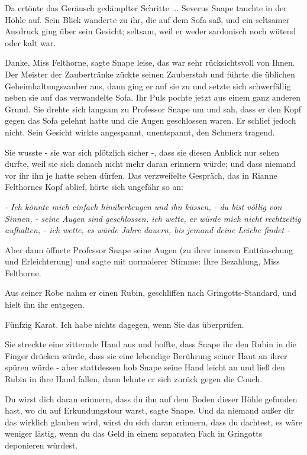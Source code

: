Da ertönte das Geräusch gedämpfter Schritte ... Severus Snape tauchte in der
Höhle auf. Sein Blick wanderte zu ihr, die auf dem Sofa saß, und ein seltsamer
Ausdruck ging über sein Gesicht; seltsam, weil er weder sardonisch noch wütend
oder kalt war.

\glqq{}Danke, Miss Felthorne\grqq{}, sagte Snape leise, \glqq{}das war sehr
rücksichtsvoll von Ihnen.\grqq{} Der Meister der Zaubertränke zückte seinen
Zauberstab und führte die üblichen Geheimhaltungszauber aus, dann ging er auf
sie zu und setzte sich schwerfällig neben sie auf das verwandelte Sofa. Ihr Puls
pochte jetzt aus einem ganz anderen Grund. Sie drehte sich langsam zu Professor
Snape um und sah, dass er den Kopf gegen das Sofa gelehnt hatte und die Augen
geschlossen waren. Er schlief jedoch nicht. Sein Gesicht wirkte angespannt,
unentspannt, den Schmerz tragend.

Sie wusste - sie war sich plötzlich sicher -, dass sie diesen Anblick nur sehen
durfte, weil sie sich danach nicht mehr daran erinnern würde; und dass niemand
vor ihr ihn je hatte sehen dürfen. Das verzweifelte Gespräch, das in Rianne
Felthornes Kopf ablief, hörte sich ungefähr so an:

\emph{- Ich könnte mich einfach hinüberbeugen und ihn küssen,}
\emph{- du bist völlig von Sinnen,}
\emph{- seine Augen sind geschlossen, ich wette, er würde mich nicht rechtzeitig
aufhalten, - ich wette, es würde Jahre dauern, bis jemand deine Leiche findet -}

Aber dann öffnete Professor Snape seine Augen (zu ihrer inneren Enttäuschung und
Erleichterung) und sagte mit normalerer Stimme: \glqq{}Ihre Bezahlung, Miss
Felthorne.\grqq{}

Aus seiner Robe nahm er einen Rubin, geschliffen nach Gringotts-Standard, und
hielt ihn ihr entgegen.

\glqq{}Fünfzig Karat. Ich habe nichts dagegen, wenn Sie das überprüfen.\grqq{}

Sie streckte eine zitternde Hand aus und hoffte, dass Snape ihr den Rubin in die
Finger drücken würde, dass sie eine lebendige Berührung seiner Haut an ihrer
spüren würde - aber stattdessen hob Snape seine Hand leicht an und ließ den
Rubin in ihre Hand fallen, dann lehnte er sich zurück gegen die Couch.

\glqq{}Du wirst dich daran erinnern, dass du ihn auf dem Boden dieser Höhle
gefunden hast, wo du auf Erkundungstour warst\grqq{}, sagte Snape. \glqq{}Und da
niemand außer dir das wirklich glauben wird, wirst du sich daran erinnern, dass
du dachtest, es wäre weniger lästig, wenn du das Geld in einem separaten Fach in
Gringotts deponieren würdest.\grqq{}

